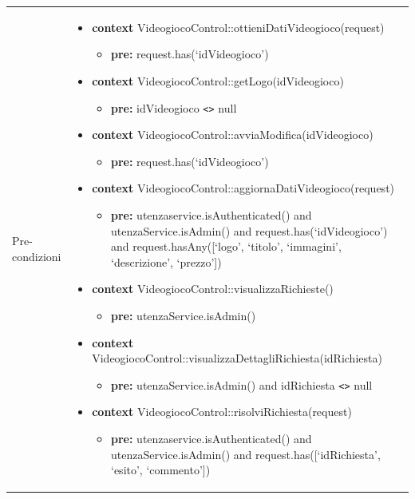 \small\begin{tabular}{|| l | p{28.5em} ||} 
\hline
Pre-condizioni & \begin{itemize}[leftmargin=*]
	\item \textbf{context} VideogiocoControl::ottieniDatiVideogioco(request)
	\begin{itemize}
		\item[ ] \textbf{pre:} request.has(‘idVideogioco’)
	\end{itemize}

	\item \textbf{context} VideogiocoControl::getLogo(idVideogioco)
	\begin{itemize}
		\item[ ] \textbf{pre:} idVideogioco \verb|<>| null
	\end{itemize}

	\item \textbf{context} VideogiocoControl::avviaModifica(idVideogioco)
	\begin{itemize}
		\item[ ] \textbf{pre:} request.has(‘idVideogioco’)
	\end{itemize}
  
	\item \textbf{context} VideogiocoControl::aggiornaDatiVideogioco(request)
	\begin{itemize}
		\item[ ] \textbf{pre:} utenzaservice.isAuthenticated() and utenzaService.isAdmin() and request.has(‘idVideogioco’) and request.hasAny([‘logo’, ‘titolo’, ‘immagini’, ‘descrizione’, ‘prezzo’]) 
	\end{itemize} 
  
	\item \textbf{context} VideogiocoControl::visualizzaRichieste()
	\begin{itemize}
		\item[ ] \textbf{pre:} utenzaService.isAdmin()
	\end{itemize} 
  
	\item \textbf{context} VideogiocoControl::visualizzaDettagliRichiesta(idRichiesta)
	\begin{itemize}
		\item[ ] \textbf{pre:} utenzaService.isAdmin() and idRichiesta \verb|<>| null
	\end{itemize} 
  
	\item \textbf{context} VideogiocoControl::risolviRichiesta(request)
	\begin{itemize}
		\item[ ] \textbf{pre:} utenzaservice.isAuthenticated() and utenzaService.isAdmin() and request.has([‘idRichiesta’, ‘esito’, ‘commento’])
	\end{itemize} 
  

\end{itemize}
\end{tabular}
